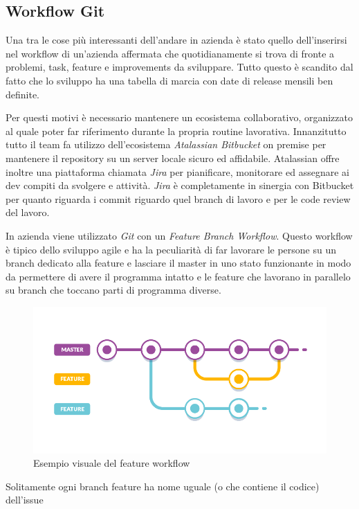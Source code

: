 \documentclass[a4paper]{article}
\begin{document}
\subsection{Workflow Git}
\par Una tra le cose più interessanti dell'andare in azienda è stato quello dell'inserirsi
nel workflow di un'azienda affermata che quotidianamente si trova di fronte a problemi,
task, feature e improvements da sviluppare. Tutto questo è scandito dal fatto che lo sviluppo
ha una tabella di marcia con date di release mensili ben definite.
\par Per questi motivi è necessario mantenere un ecosistema collaborativo, organizzato
al quale poter far riferimento durante la propria routine lavorativa.
Innanzitutto tutto il team fa utilizzo dell'ecosistema \emph{Atalassian Bitbucket}
on premise per mantenere il repository su un server locale sicuro ed affidabile.
Atalassian offre inoltre una piattaforma chiamata \emph{Jira} per pianificare, monitorare ed assegnare
ai dev compiti da svolgere e attività. \emph{Jira} è completamente in sinergia con
Bitbucket per quanto riguarda i commit riguardo quel branch di lavoro e per le code review 
del lavoro.
\par In azienda viene utilizzato \emph{Git} con un \emph{Feature Branch Workflow}.
Questo workflow è tipico dello sviluppo agile e ha la peculiarità di far lavorare
le persone su un branch dedicato alla feature e lasciare il master in uno stato funzionante
in modo da permettere di avere il programma intatto e le feature che lavorano in parallelo 
su branch che toccano parti di programma diverse.
\begin{figure}[H]
	\includegraphics[width=\textwidth]{feature-branch.png}
	\centering
	\caption{Esempio visuale del feature workflow}
\end{figure}
\par Solitamente ogni branch feature ha nome uguale (o che contiene il codice) dell'issue
\end{document}
